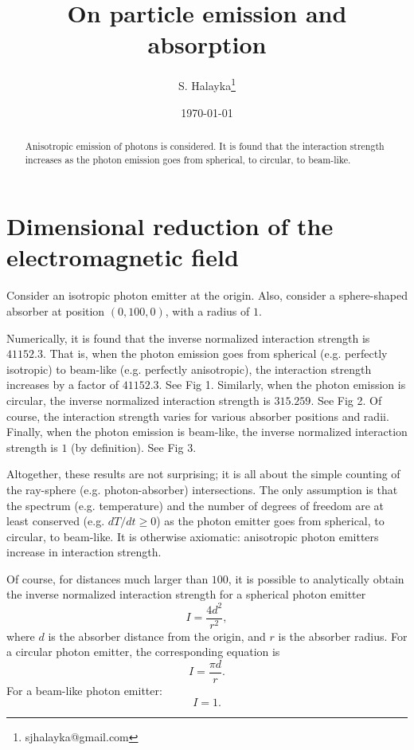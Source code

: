 \documentclass[12pt]{article}
\title{On particle emission and absorption}
\author{S. Halayka\footnote{sjhalayka@gmail.com}}
\date{\today}
\begin{document}
\maketitle

\begin{abstract}
Anisotropic emission of photons is considered.
It is found that the interaction strength increases as the photon emission goes from spherical, to circular, to beam-like.
\end{abstract}



\section{Dimensional reduction of the electromagnetic field}
Consider an isotropic photon emitter at the origin.
Also, consider a sphere-shaped absorber at position $(0, 100, 0)$, with a radius of $1$.

Numerically, it is found that the inverse normalized interaction strength is $41152.3$.
That is, when the photon emission goes from spherical (e.g. perfectly isotropic) to beam-like (e.g. perfectly anisotropic), the interaction strength increases by a factor of $41152.3$.
See Fig 1.
Similarly, when the photon emission is circular, the inverse normalized interaction strength is $315.259$.
See Fig 2.
Of course, the interaction strength varies for various absorber positions and radii.
Finally, when the photon emission is beam-like, the inverse normalized interaction strength is $1$ (by definition).
See Fig 3.

Altogether, these results are not surprising; it is all about the simple counting of the ray-sphere (e.g. photon-absorber) intersections. 
The only assumption is that the spectrum (e.g. temperature) and the number of degrees of freedom are at least conserved (e.g. $dT/dt \geq 0$) as the photon emitter goes from spherical, to circular, to beam-like.
It is otherwise axiomatic: anisotropic photon emitters increase in interaction strength.

Of course, for distances much larger than $100$, it is possible to analytically obtain the inverse normalized interaction strength for a spherical photon emitter
\begin{equation}
I = \frac{4 d^2}{r^2},
\end{equation}
where $d$ is the absorber distance from the origin, and $r$ is the absorber radius.
For a circular photon emitter, the corresponding equation is
\begin{equation}
I = \frac{\pi d}{r}.
\end{equation}
For a beam-like photon emitter:
\begin{equation}
I = 1.
\end{equation}
\end{document}
